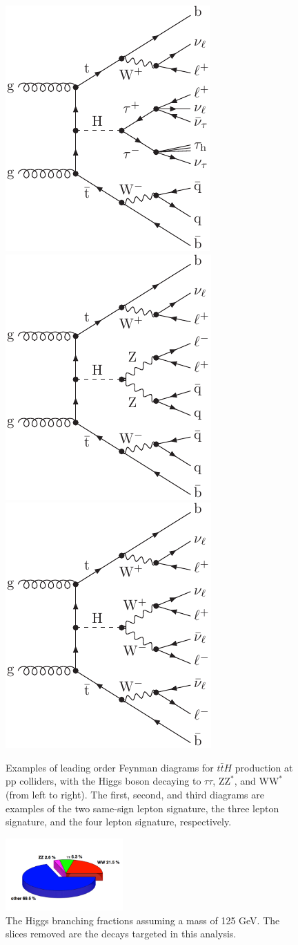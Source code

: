 \begin{figure}[htb]
\centering
\includegraphics[width=0.25\linewidth]{ch2_figs/gg-ttH-tt-2lss.pdf}
\hspace{0.5cm}
\includegraphics[width=0.25\linewidth]{ch2_figs/gg-ttH-ZZ-3l.pdf}
\hspace{0.5cm}
\includegraphics[width=0.25\linewidth]{ch2_figs/gg-ttH-WW-4l.pdf}
\caption{Examples of leading order Feynman diagrams for $t\bar{t}H$ production at pp colliders, with the Higgs boson decaying to
$\tau\tau$, $\mathrm{ZZ}^{*}$, and
$\mathrm{WW}^{*}$ (from left to right). The first, second, and third diagrams are examples of the two same-sign lepton signature,
the three lepton signature, and the four lepton signature, respectively.}
\label{fig:tth_example_diagram}
\end{figure}

\begin{figure}[hbtp]
 \begin{center}
   \includegraphics[width=0.4\textwidth]{ch2_figs/pie.pdf}
   \caption{The Higgs branching fractions assuming a mass of 125 GeV. The slices removed are the decays targeted in this analysis.}
   \label{fig:pie}
 \end{center}
\end{figure}

%
% 
% 
